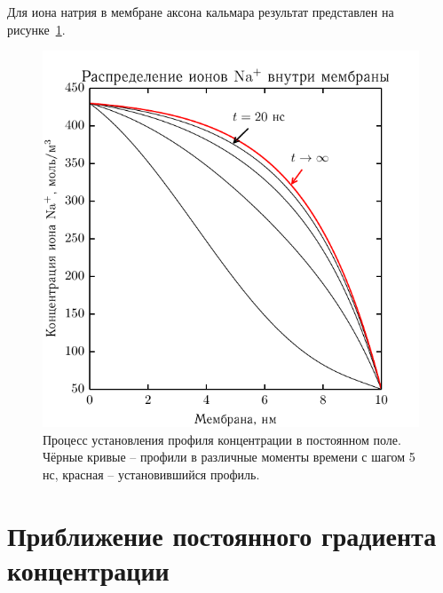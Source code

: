     Для иона натрия в мембране аксона кальмара результат представлен на
    рисунке~\ref{fig:1}.
    \begin{figure}[h]
    \begin{center}
        \includegraphics[width=.7\textwidth]{plots/linear_field}
    \end{center}
    \caption{Процесс установления профиля концентрации в постоянном поле. Чёрные
    кривые -- профили в различные моменты времени с шагом 5 нс, красная --
    установившийся профиль.}
    \label{fig:1}
    \end{figure}


\section{Приближение постоянного градиента концентрации}
